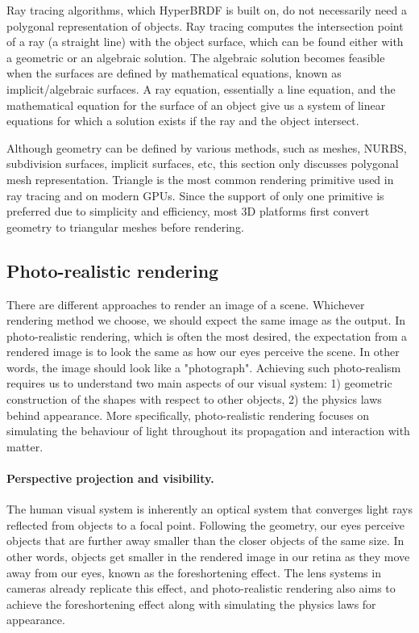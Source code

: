 Ray tracing algorithms, which HyperBRDF is built on, do not necessarily need a polygonal representation of objects. Ray tracing computes the intersection point of a ray (a straight line) with the object surface, which can be found either with a geometric or an algebraic solution. The algebraic solution becomes feasible when the surfaces are defined by mathematical equations, known as implicit/algebraic surfaces. A ray equation, essentially a line equation, and the mathematical equation for the surface of an object give us a system of linear equations for which a solution exists if the ray and the object intersect.

 Although geometry can be defined by various methods, such as meshes, NURBS, subdivision surfaces, implicit surfaces, etc, this section only discusses polygonal mesh representation. Triangle is the most common rendering primitive used in ray tracing and on modern GPUs. Since the support of only one primitive is preferred due to simplicity and efficiency, most 3D platforms first convert geometry to triangular meshes before rendering.
 
\subsection{Photo-realistic rendering}
There are different approaches to render an image of a scene. Whichever rendering method we choose, we should expect the same image as the output. In photo-realistic rendering, which is often the most desired, the expectation from a rendered image is to look the same as how our eyes perceive the scene. In other words, the image should look like a "photograph". Achieving such photo-realism requires us to understand two main aspects of our visual system: 1) geometric construction of the shapes with respect to other objects, 2) the physics laws behind appearance. More specifically, photo-realistic rendering focuses on simulating the behaviour of light throughout its propagation and interaction with matter.

\paragraph{Perspective projection and visibility.}

The human visual system is inherently an optical system that converges light rays reflected from objects to a focal point. Following the geometry, our eyes perceive objects that are further away smaller than the closer objects of the same size. In other words, objects get smaller in the rendered image in our retina as they move away from our eyes, known as the foreshortening effect. The lens systems in cameras already replicate this effect, and photo-realistic rendering also aims to achieve the foreshortening effect along with simulating the physics laws for appearance.  

